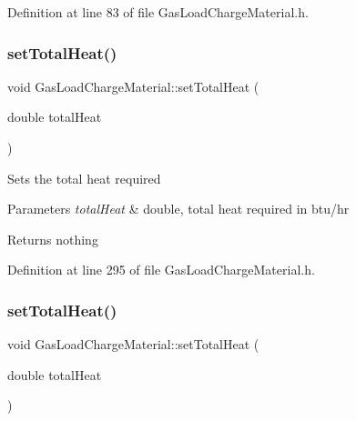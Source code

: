 Definition at line 83 of file Gas\+Load\+Charge\+Material.\+h.

\mbox{\label{class_gas_load_charge_material_aae01f6f4f923965c111e1dac66eb8365}} 
\subsubsection{\texorpdfstring{set\+Total\+Heat()}{setTotalHeat()}\hspace{0.1cm}{\footnotesize\ttfamily [1/3]}}
{\footnotesize\ttfamily void Gas\+Load\+Charge\+Material\+::set\+Total\+Heat (\begin{DoxyParamCaption}\item[{double}]{total\+Heat }\end{DoxyParamCaption})\hspace{0.3cm}{\ttfamily [inline]}}

Sets the total heat required


\begin{DoxyParams}{Parameters}
{\em total\+Heat} & double, total heat required in btu/hr\\
\hline
\end{DoxyParams}
\begin{DoxyReturn}{Returns}
nothing 
\end{DoxyReturn}


Definition at line 295 of file Gas\+Load\+Charge\+Material.\+h.

\mbox{\label{class_gas_load_charge_material_aae01f6f4f923965c111e1dac66eb8365}} 
\subsubsection{\texorpdfstring{set\+Total\+Heat()}{setTotalHeat()}\hspace{0.1cm}{\footnotesize\ttfamily [2/3]}}
{\footnotesize\ttfamily void Gas\+Load\+Charge\+Material\+::set\+Total\+Heat (\begin{DoxyParamCaption}\item[{double}]{total\+Heat }\end{DoxyParamCaption})\hspace{0.3cm}{\ttfamily [inline]}}


